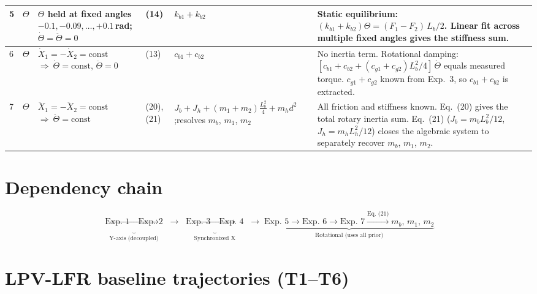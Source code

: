\documentclass[a4paper, 11pt]{article}
\begin{document}
\begin{table}[htbp]
\begin{tabular}{C{0.5cm} C{0.9cm} L{3.2cm} C{1.0cm} L{3.2cm} L{5.0cm}}
\midrule

5 & $\Theta$ &
$\Theta$ held at fixed angles\newline $-0.1, -0.09, \ldots, +0.1$\,rad;\newline $\dot{\Theta} = \ddot{\Theta} = 0$ &
(14) &
$k_{b1}{+}k_{b2}$ &
Static equilibrium: $(k_{b1}+k_{b2})\Theta = (F_1-F_2)\,L_b/2$.
Linear fit across multiple fixed angles gives the stiffness sum. \\

\midrule

6 & $\Theta$ &
$\dot{X}_1 = -\dot{X}_2 = \text{const}$\newline $\Rightarrow\ \dot{\Theta} = \text{const}$, $\ddot{\Theta} = 0$ &
(13) &
$c_{b1}{+}c_{b2}$ &
No inertia term. Rotational damping: $[c_{b1}+c_{b2}+(c_{g1}+c_{g2})L_b^2/4]\,\dot{\Theta}$
equals measured torque. $c_{g1}+c_{g2}$ known from Exp.~3, so $c_{b1}+c_{b2}$ is extracted. \\

\midrule

7 & $\Theta$ &
$\ddot{X}_1 = -\ddot{X}_2 = \text{const}$\newline $\Rightarrow\ \ddot{\Theta} = \text{const}$ &
(20),(21) &
$J_b{+}J_h{+}(m_1{+}m_2)\tfrac{L_b^2}{4}{+}m_h d^2$;\newline resolves $m_b$, $m_1$, $m_2$ &
All friction and stiffness known. Eq.~(20) gives the total rotary inertia sum.
Eq.~(21) ($J_b = m_b L_b^2/12$, $J_h = m_h L_h^2/12$) closes the algebraic system
to separately recover $m_b$, $m_1$, $m_2$. \\

\bottomrule
\end{tabular}
\end{table}

\section*{Dependency chain}

\[
\underbrace{\text{Exp.~1} \to \text{Exp.~2}}_{\text{Y-axis (decoupled)}}
\;\longrightarrow\;
\underbrace{\text{Exp.~3} \to \text{Exp.~4}}_{\text{Synchronized X}}
\;\longrightarrow\;
\underbrace{\text{Exp.~5} \to \text{Exp.~6} \to \text{Exp.~7} \xrightarrow{\text{Eq.~(21)}} m_b,\,m_1,\,m_2}_{\text{Rotational (uses all prior)}}
\]

\newpage
\section*{LPV-LFR baseline trajectories (T1--T6)}
\end{document}
